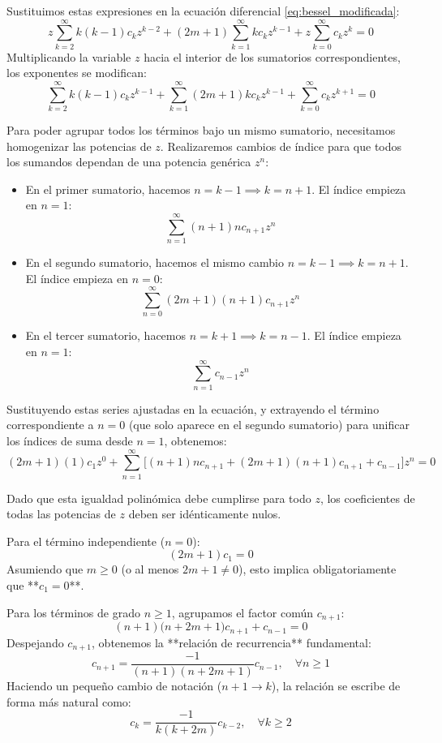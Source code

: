 Sustituimos estas expresiones en la ecuación diferencial \eqref{eq:bessel_modificada}:
\[
    z \sum_{k=2}^{\infty} k(k-1) c_k z^{k-2} + (2m + 1) \sum_{k=1}^{\infty} k c_k z^{k-1} + z \sum_{k=0}^{\infty} c_k z^k = 0
\]
Multiplicando la variable $z$ hacia el interior de los sumatorios correspondientes, los exponentes se modifican:
\[
    \sum_{k=2}^{\infty} k(k-1) c_k z^{k-1} + \sum_{k=1}^{\infty} (2m + 1) k c_k z^{k-1} + \sum_{k=0}^{\infty} c_k z^{k+1} = 0
\]

Para poder agrupar todos los términos bajo un mismo sumatorio, necesitamos homogenizar las potencias de $z$. Realizaremos cambios de índice para que todos los sumandos dependan de una potencia genérica $z^n$:
\begin{itemize}
    \item En el primer sumatorio, hacemos $n = k-1 \implies k = n+1$. El índice empieza en $n = 1$:
    \[ \sum_{n=1}^{\infty} (n+1)n c_{n+1} z^n \]
    \item En el segundo sumatorio, hacemos el mismo cambio $n = k-1 \implies k = n+1$. El índice empieza en $n = 0$:
    \[ \sum_{n=0}^{\infty} (2m + 1)(n+1) c_{n+1} z^n \]
    \item En el tercer sumatorio, hacemos $n = k+1 \implies k = n-1$. El índice empieza en $n = 1$:
    \[ \sum_{n=1}^{\infty} c_{n-1} z^n \]
\end{itemize}

Sustituyendo estas series ajustadas en la ecuación, y extrayendo el término correspondiente a $n=0$ (que solo aparece en el segundo sumatorio) para unificar los índices de suma desde $n=1$, obtenemos:
\[
    (2m+1)(1) c_1 z^0 + \sum_{n=1}^{\infty} \Big[ (n+1)n c_{n+1} + (2m+1)(n+1) c_{n+1} + c_{n-1} \Big] z^n = 0
\]

Dado que esta igualdad polinómica debe cumplirse para todo $z$, los coeficientes de todas las potencias de $z$ deben ser idénticamente nulos. 

Para el término independiente ($n=0$):
\[
    (2m+1)c_1 = 0
\]
Asumiendo que $m \geq 0$ (o al menos $2m+1 \neq 0$), esto implica obligatoriamente que **$c_1 = 0$**.

Para los términos de grado $n \geq 1$, agrupamos el factor común $c_{n+1}$:
\[
    (n+1) \big( n + 2m + 1 \big) c_{n+1} + c_{n-1} = 0
\]
Despejando $c_{n+1}$, obtenemos la **relación de recurrencia** fundamental:
\[
    c_{n+1} = \frac{-1}{(n+1)(n + 2m + 1)} c_{n-1}, \quad \forall n \geq 1
\]
Haciendo un pequeño cambio de notación ($n+1 \to k$), la relación se escribe de forma más natural como:
\[
    c_k = \frac{-1}{k(k + 2m)} c_{k-2}, \quad \forall k \geq 2
\]

